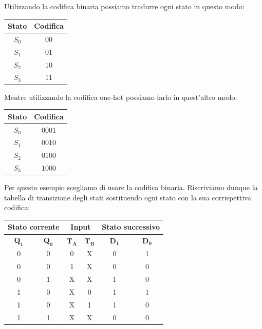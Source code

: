 \documentclass[11pt, a4paper, titlepage, oneside]{scrbook}
\begin{document}
Utilizzando la codifica binaria possiamo tradurre ogni stato in questo modo:

\begin{table}[H]
  \centering
  \begin{tabular}{|c|c|}
    \hline
    \textbf{Stato} & \textbf{Codifica} \\
    \hline
    $S_0$ & $00$ \\
    $S_1$ & $01$ \\
    $S_2$ & $10$ \\
    $S_3$ & $11$ \\ \hline
  \end{tabular}
\end{table}

Mentre utilizzando la codifica one-hot possiamo farlo in quest'altro modo: 

\begin{table}[H]
  \centering
  \begin{tabular}{|c|c|}
    \hline
    \textbf{Stato} & \textbf{Codifica} \\
    \hline
    $S_0$ & $0001$ \\
    $S_1$ & $0010$ \\
    $S_2$ & $0100$ \\
    $S_3$ & $1000$ \\ \hline
  \end{tabular}
\end{table}

Per questo esempio scegliamo di usare la codifica binaria. Riscriviamo dunque la tabella di transizione degli stati sostituendo ogni stato con la sua corrispettiva codifica:

\begin{table}[H]
  \centering
  \begin{tabular}{|c|c|c|c|c|c|}
    \hline
    \multicolumn{2}{|c|}{\textbf{Stato corrente}} &
    \multicolumn{2}{c|}{\textbf{Input}} &
    \multicolumn{2}{c|}{\textbf{Stato successivo}} \\
    \hline
    $\bm{Q_1}$ & $\bm{Q_0}$ & $\bm{T_A}$ & $\bm{T_B}$ & $\bm{D_1}$ & $\bm{D_0}$ \\
    \hline
    0 & 0 & 0 & X & 0 & 1 \\
    0 & 0 & 1 & X & 0 & 0 \\
    0 & 1 & X & X & 1 & 0 \\
    1 & 0 & X & 0 & 1 & 1 \\
    1 & 0 & X & 1 & 1 & 0 \\
    1 & 1 & X & X & 0 & 0 \\
    \hline
  \end{tabular}
\end{table}
\end{document}
